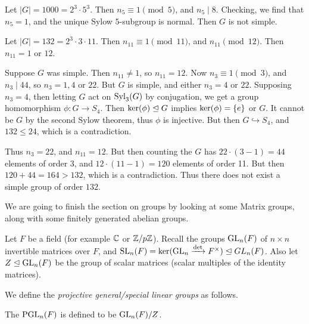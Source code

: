 \documentclass[a4paper]{scrartcl}
\begin{document}
\begin{example}
Let $|G| = 1000 = 2^3 \cdot 5^3$. Then $n_5 \equiv 1 \pmod{5}$, and $n_5 \mid 8$. Checking, we find that $n_5 = 1$, and the unique Sylow $5$-subgroup is normal. Then $G$ is not simple.
\end{example}


\begin{example}
	Let $|G| = 132 = 2^3 \cdot 3 \cdot 11$. Then $n_{11} \equiv 1 \pmod{11}$, and $n_{11} \pmod 12$. Then $n_{11} = 1$ or $12$. 

	Suppose $G$ was simple. Then $n_{11} \neq 1$, so $n_{11} = 12$. Now $n_3 \equiv 1 \pmod{3}$, and $n_3 \mid 44$, so $n_3 = 1, 4$ or $22$. But $G$ is simple, and either $n_3 = 4$ or $22$. Supposing $n_3 = 4$, then letting $G$ act on $\operatorname{Syl}_3(G)$ by conjugation, we get a group homomorphism $\phi: G \rightarrow S_4$. Then $\operatorname{ker}(\phi) \trianglelefteq G$ implies $\operatorname{ker}(\phi) = \{e\}$ or $G$. It cannot be $G$ by the second Sylow theorem, thus $\phi$ is injective. But then $G \hookrightarrow S_4$, and $132 \leq 24$, which is a contradiction.

	Thus $n_3 = 22$, and $n_11 = 12$. But then counting the $G$ has $22 \cdot (3 - 1) = 44$ elements of order 3, and $12 \cdot (11 - 1) = 120$ elements of order 11. But then $120 + 44 = 164 > 132$, which is a contradiction. Thus there does not exist a simple group of order $132$. 
\end{example}


We are going to finish the section on groups by looking at some Matrix groups, along with some finitely generated abelian groups.


Let $F$ be a field (for example $\mathbb{C}$ or $\mathbb{Z}/p\mathbb{Z}$). 
Recall the groups $\operatorname{GL}_n(F)$ of $n \times n$ 
invertible matrices over $F$, and $\operatorname{SL}_n(F) = \operatorname{ker}(\operatorname{GL}_n \xrightarrow{\det} F^\times) \trianglelefteq GL_n(F)$.
Also let $Z \trianglelefteq \operatorname{GL}_n(F)$ be the group of scalar matrices (scalar multiples of the identity matrices). 

We define the \emph{projective general/special linear groups} as follows.

\begin{definition}
	The  $\operatorname{PGL}_n(F)$ is defined to be $\operatorname{GL}_n(F) / Z$.
\end{definition}
\end{document}
